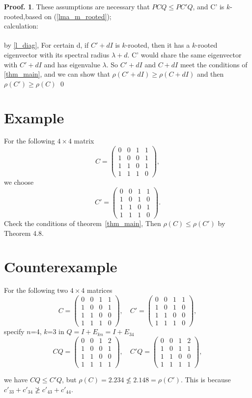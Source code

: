 \documentclass[12pt]{report}
\theoremstyle{plain}
\theoremstyle{definition}
\newtheorem{pof}[thm]{Proof.}
\begin{document}
\begin{pof}
These assumptions are necessary that $PCQ \leq PC'Q$, and C' is $k$-rooted,based on
 (\ref{lma_m_rooted});\\
 calculation:  \\
    \\
 by \ref{l_diag}, For certain d, if $C'+dI$ is $k$-rooted, then it has
  a $k$-rooted eigenvector with its spectral radius $\lambda + d$. C' would share the same
   eigenvector with $C'+dI$ and has eigenvalue $\lambda$. So $C'+dI$ and $C+dI$ meet the
    conditions of \ref{thm_main}, and we can show that $\rho(C' + dI) \geq \rho(C +dI)$ and
     then $\rho(C') \geq \rho(C)$  \qed
\end{pof}
  

\section{Example}
For the following $4\times 4$ matrix
$$C=\begin{pmatrix}
0 & 0 & 1 & 1\\
1 & 0 & 0 & 1\\
1 & 1 & 0 & 1\\
1 & 1 & 1 & 0
\end{pmatrix},$$
we choose
$$C'=\begin{pmatrix}
0 & 0 & 1 & 1\\
1 & 0 & 1 &  0\\
1 & 1 & 0 & 1\\
1 & 1 & 1 & 0
\end{pmatrix}.$$
Check the conditions of theorem~\ref{thm_main},   
Then
$\rho(C)\leq \rho(C')$ by Theorem 4.8. %




\section{Counterexample}
For the following two $4\times 4$ matrices
$$C=\begin{pmatrix}
0 & 0 & 1 & 1\\
1 & 0 & 0 & 1\\
1 & 1 & 0 & 0\\
1 & 1 & 1 & 0
\end{pmatrix},\quad C'=\begin{pmatrix}
0 & 0 & 1 & 1\\
1 & 0 & 1 &  0\\
1 & 1 & 0 & 0\\
1 & 1 & 1 & 0
\end{pmatrix},$$
specify $n$=4, $k$=3 in $Q = I +E_{kn} = I + E_{34}$  
$$CQ=\begin{pmatrix}
0 & 0 & 1 & 2\\
1 & 0 & 0 & 1\\
1 & 1 & 0 & 0\\
1 & 1 & 1 & 1
\end{pmatrix},\quad C'Q=\begin{pmatrix}
0 & 0 & 1 & 2\\
1 & 0 & 1 & 1\\
1 & 1 & 0 & 0\\
1 & 1 & 1 & 1
\end{pmatrix},$$

we have $CQ\leq C'Q$, but
$\rho(C)=2.234\not\leq 2.148= \rho(C')$.
This is because $c'_{33}+c'_{34}\not\geq c'_{43}+c'_{44}$.
\end{document}
